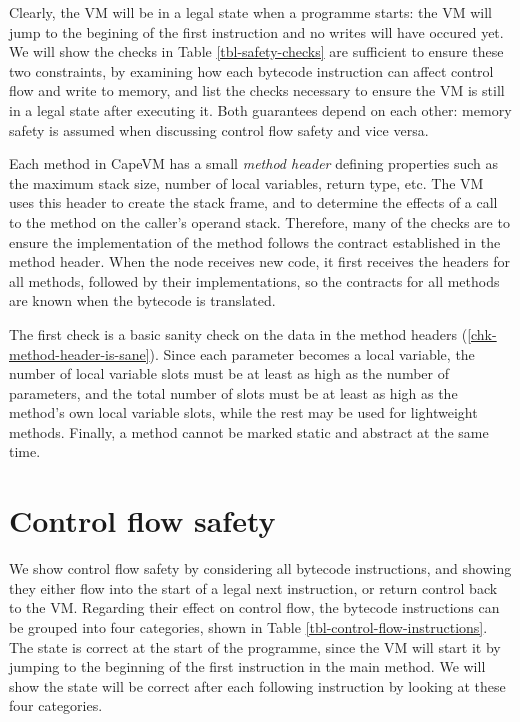 Clearly, the VM will be in a legal state when a programme starts: the VM will jump to the begining of the first instruction and no writes will have occured yet. We will show the checks in Table \ref{tbl-safety-checks} are sufficient to ensure these two constraints, by examining how each bytecode instruction can affect control flow and write to memory, and list the checks necessary to ensure the VM is still in a legal state after executing it. Both guarantees depend on each other: memory safety is assumed when discussing control flow safety and vice versa.

Each method in CapeVM has a small \emph{method header} defining properties such as the maximum stack size, number of local variables, return type, etc. The VM uses this header to create the stack frame, and to determine the effects of a call to the method on the caller's operand stack. Therefore, many of the checks are to ensure the implementation of the method follows the contract established in the method header. When the node receives new code, it first receives the headers for all methods, followed by their implementations, so the contracts for all methods are known when the bytecode is translated.

The first check is a basic sanity check on the data in the method headers (\ref{chk-method-header-is-sane}). Since each parameter becomes a local variable, the number of local variable slots must be at least as high as the number of parameters, and the total number of slots must be at least as high as the method's own local variable slots, while the rest may be used for lightweight methods. Finally, a method cannot be marked static and abstract at the same time.

\section{Control flow safety}
We show control flow safety by considering all bytecode instructions, and showing they either flow into the start of a legal next instruction, or return control back to the VM. Regarding their effect on control flow, the bytecode instructions can be grouped into four categories, shown in Table \ref{tbl-control-flow-instructions}. The state is correct at the start of the programme, since the VM will start it by jumping to the beginning of the first instruction in the main method. We will show the state will be correct after each following instruction by looking at these four categories.

